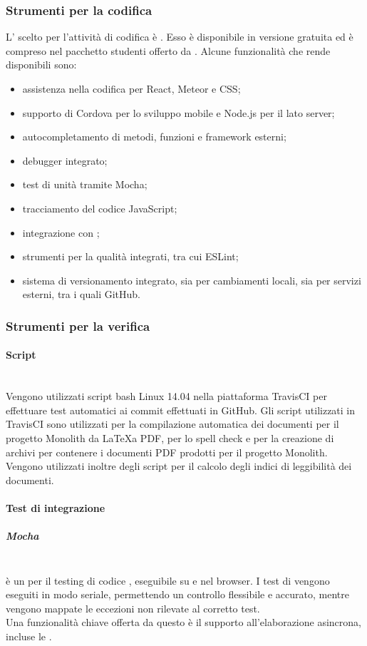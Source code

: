\subsubsection{Strumenti per la codifica}
L' scelto per l'attività di codifica è \textbf{}. Esso è disponibile in versione gratuita ed è compreso nel pacchetto studenti offerto da . Alcune funzionalità che rende disponibili sono:
\begin{itemize}
	\item assistenza nella codifica per React, Meteor e CSS;
	\item supporto di Cordova per lo sviluppo mobile e Node.js per il lato server;
	\item autocompletamento di metodi, funzioni e framework esterni;
	\item debugger integrato;
	\item test di unità tramite Mocha;
	\item tracciamento del codice JavaScript;
	\item integrazione con ;
	\item strumenti per la qualità integrati, tra cui ESLint;
	\item sistema di versionamento integrato, sia per cambiamenti locali, sia per servizi esterni, tra i quali GitHub.
\end{itemize}

\subsubsection{Strumenti per la verifica}
\paragraph{Script}\mbox{}\\
Vengono utilizzati script bash Linux 14.04 nella piattaforma TravisCI per effettuare test automatici ai commit effettuati in GitHub.
Gli script utilizzati in TravisCI sono utilizzati per la compilazione automatica dei documenti per il progetto Monolith da \LaTeX a PDF, per lo spell check e per la creazione di archivi per contenere i documenti PDF prodotti per il progetto Monolith.
Vengono utilizzati inoltre degli script per il calcolo degli indici di leggibilità dei documenti.


\paragraph{Test di integrazione}\mbox{}
\subparagraph{Mocha}\mbox{}\\
 è un  per il testing di codice , eseguibile su  e nel browser. I test di  vengono eseguiti in modo seriale, permettendo un controllo flessibile e accurato, mentre vengono mappate le eccezioni non rilevate al corretto test.\\
Una funzionalità chiave offerta da questo  è il supporto all’elaborazione asincrona, incluse le .


